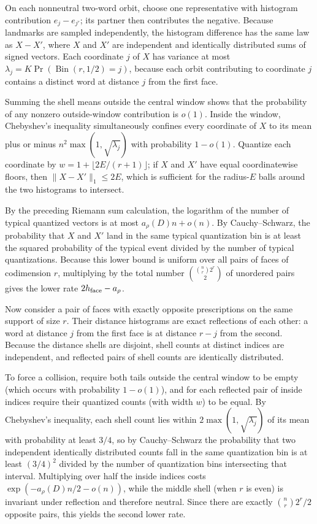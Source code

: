 On each nonneutral two-word orbit, choose one representative with histogram contribution $e_j-e_{j'}$; its partner then contributes the negative. Because landmarks are sampled independently, the histogram difference has the same law as $X-X'$, where $X$ and $X'$ are independent and identically distributed sums of signed vectors. Each coordinate $j$ of $X$ has variance at most $\lambda_j=K\Pr(\operatorname{Bin}(r,1/2)=j)$, because each orbit contributing to coordinate $j$ contains a distinct word at distance $j$ from the first face.

Summing the shell means outside the central window shows that the probability of any nonzero outside-window contribution is $o(1)$. Inside the window, Chebyshev's inequality simultaneously confines every coordinate of $X$ to its mean plus or minus $n^2\max(1,\sqrt{\lambda_j})$ with probability $1-o(1)$. Quantize each coordinate by $w=1+\lfloor2E/(r+1)\rfloor$; if $X$ and $X'$ have equal coordinatewise floors, then $\|X-X'\|_1\le2E$, which is sufficient for the radius-$E$ balls around the two histograms to intersect.

By the preceding Riemann sum calculation, the logarithm of the number of typical quantized vectors is at most $a_\rho(D)n+o(n)$. By Cauchy--Schwarz, the probability that $X$ and $X'$ land in the same typical quantization bin is at least the squared probability of the typical event divided by the number of typical quantizations. Because this lower bound is uniform over all pairs of faces of codimension $r$, multiplying by the total number $\binom{\binom nr2^r}{2}$ of unordered pairs gives the lower rate $2h_{\rm face}-a_\rho$.

Now consider a pair of faces with exactly opposite prescriptions on the same support of size $r$. Their distance histograms are exact reflections of each other: a word at distance $j$ from the first face is at distance $r-j$ from the second. Because the distance shells are disjoint, shell counts at distinct indices are independent, and reflected pairs of shell counts are identically distributed.

To force a collision, require both tails outside the central window to be empty (which occurs with probability $1-o(1)$), and for each reflected pair of inside indices require their quantized counts (with width $w$) to be equal. By Chebyshev's inequality, each shell count lies within $2\max(1,\sqrt{\lambda_j})$ of its mean with probability at least $3/4$, so by Cauchy--Schwarz the probability that two independent identically distributed counts fall in the same quantization bin is at least $(3/4)^2$ divided by the number of quantization bins intersecting that interval. Multiplying over half the inside indices costs $\exp(-a_\rho(D)n/2-o(n))$, while the middle shell (when $r$ is even) is invariant under reflection and therefore neutral. Since there are exactly $\binom nr2^r/2$ opposite pairs, this yields the second lower rate.

